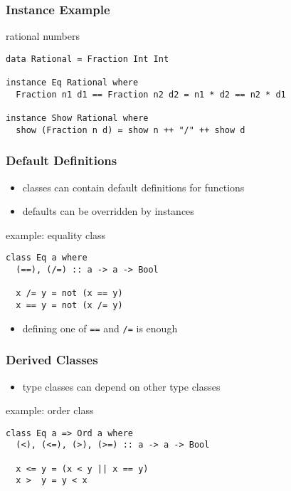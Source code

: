 \documentclass[dvipsnames]{beamer}
\theoremstyle{plain}
\begin{document}
\begin{frame}[fragile]
  \frametitle{Instance Example}

  \begin{exampleblock}{rational numbers}
    \begin{lstlisting}
data Rational = Fraction Int Int

instance Eq Rational where
  Fraction n1 d1 == Fraction n2 d2 = n1 * d2 == n2 * d1

instance Show Rational where
  show (Fraction n d) = show n ++ "/" ++ show d
    \end{lstlisting}
  \end{exampleblock}
\end{frame}

\begin{frame}[fragile]
  \frametitle{Default Definitions}

  \begin{itemize}
    \item classes can contain default definitions for functions
    \item defaults can be overridden by instances
  \end{itemize}

  \begin{exampleblock}{example: equality class}
    \begin{lstlisting}
class Eq a where
  (==), (/=) :: a -> a -> Bool

  x /= y = not (x == y)
  x == y = not (x /= y)
    \end{lstlisting}
  \end{exampleblock}

  \begin{itemize}
    \item defining one of \lstinline|==| and \lstinline|/=| is enough
  \end{itemize}
\end{frame}

\begin{frame}[fragile]
  \frametitle{Derived Classes}

  \begin{itemize}
    \item type classes can depend on other type classes
  \end{itemize}

  \begin{exampleblock}{example: order class}
    \begin{lstlisting}
class Eq a => Ord a where
  (<), (<=), (>), (>=) :: a -> a -> Bool

  x <= y = (x < y || x == y)
  x >  y = y < x
    \end{lstlisting}
  \end{exampleblock}
\end{frame}
\end{document}
